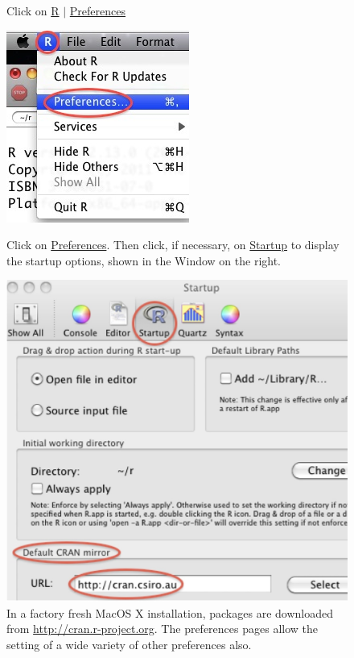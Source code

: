 \documentclass{tufte-book}\usepackage[]{graphicx}\usepackage[]{color}
\begin{document}
\noindent
\begin{figure}[h]
 Click on \underline{R} $\mid$ \underline{Preferences}\\
\begin{minipage}[t]{0.31\textwidth}
\vspace*{0pt}

\includegraphics{figs-inc/16i-mac-rprefs.jpg}

Click on \underline{Preferences}.  Then click, if necessary, on
\underline{Startup} to display the startup options, shown in the
Window on the right.
\end{minipage}
\hspace*{0.02\textwidth}
\begin{minipage}[t]{0.655\textwidth}
\vspace*{0pt}

\includegraphics{figs-inc/16i-mac-rstartup.jpg}
\end{minipage}
\caption{In a factory fresh MacOS X installation, packages are
  downloaded from \url{http://cran.r-project.org}.  The preferences
  pages allow the setting of a wide variety of other preferences
  also.}
\end{figure}
\end{document}
